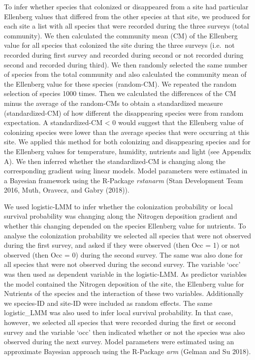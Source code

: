 \documentclass[fleqn,10pt,lineno]{wlpeerj} %
\theoremstyle{definition}
\theoremstyle{definition}
\theoremstyle{definition}
\theoremstyle{remark}
\begin{document}
To infer whether species that colonized or disappeared from a site had
particular Ellenberg values that differed from the other species at that
site, we produced for each site a list with all species that were
recorded during the three surveys (total community). We then calculated
the community mean (CM) of the Ellenberg value for all species that
colonized the site during the three surveys (i.e.~not recorded during
first survey and recorded during second or not recorded during second
and recorded during third). We then randomly selected the same number of
species from the total community and also calculated the community mean
of the Ellenberg value for these species (random-CM). We repeated the
random selection of species 1000 times. Then we calculated the
differences of the CM minus the average of the random-CMs to obtain a
standardized measure (standardized-CM) of how different the disappearing
species were from random expectation. A standardized-CM \textless{} 0
would suggest that the Ellenberg value of colonizing species were lower
than the average species that were occurring at this site. We applied
this method for both colonizing and disappearing species and for the
Ellenberg values for temperature, humidity, nutrients and light (see
Appendix A). We then inferred whether the standardized-CM is changing
along the corresponding gradient using linear models. Model parameters
were estimated in a Bayesian framework using the R-Package
\emph{rstanarm} (Stan Development Team 2016, Muth, Oravecz, and Gabry
(2018)).

We used logistic-LMM to infer whether the colonization probability or
local survival probability was changing along the Nitrogen deposition
gradient and whether this changing depended on the species Ellenberg
value for nutrients. To analyse the colonization probability we selected
all species that were not observed during the first survey, and asked if
they were observed (then Occ = 1) or not observed (then Occ = 0) during
the second survey. The same was also done for all species that were not
observed during the second survey. The variable `occ' was then used as
dependent variable in the logistic-LMM. As predictor variables the model
contained the Nitrogen deposition of the site, the Ellenberg value for
Nutrients of the species and the interaction of these two variables.
Additionally we species-ID and site-ID were included as random effects.
The same logistic\_LMM was also used to infer local survival
probability. In that case, however, we selected all species that were
recorded during the first or second survey and the variable `occ' then
indicated whether or not the species was also observed during the next
survey. Model parameters were estimated using an approximate Bayesian
approach using the R-Package \emph{arm} (Gelman and Su 2018).
\end{document}

